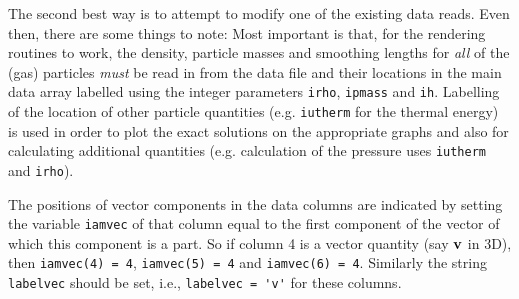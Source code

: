 \documentclass[a4paper,10pt]{article}
\begin{document}
 The second best way is to attempt to modify one of the existing data reads. Even then, there are some things to note: Most important is that, for the rendering routines to work, the density, particle masses and smoothing lengths for \emph{all} of the (gas) particles \emph{must} be read in from
the data file and their locations in the main data array labelled using the integer
parameters \verb+irho+, \verb+ipmass+ and \verb+ih+. Labelling of the location of other particle
quantities (e.g. \verb+iutherm+ for the thermal energy) is used in
order to plot the exact solutions on the appropriate graphs and also for calculating
additional quantities (e.g. calculation of the pressure uses \verb+iutherm+ and
\verb+irho+).

 The positions of vector components in the data columns are indicated by setting the variable \verb+iamvec+ of that
column equal to the first component of the vector of which this component is a part. So if column 4
is a vector quantity (say ${\bf v}$ in 3D), then \verb+iamvec(4) = 4+, \verb+iamvec(5) = 4+ and
\verb+iamvec(6) = 4+. Similarly the string \verb+labelvec+ should be set, i.e., \verb+labelvec = 'v'+ for these columns.


\end{document}
